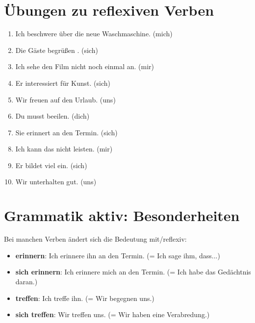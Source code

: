 \section{Übungen zu reflexiven Verben}
\label{sec:ReflexivUebungenAlt}

\begin{enumerate}
    \item Ich beschwere \underline{\hspace{1cm}} über die neue Waschmaschine. (mich)
    \item Die Gäste begrüßen \underline{\hspace{1cm}}. (sich)
    \item Ich sehe \underline{\hspace{1cm}} den Film nicht noch einmal an. (mir)
    \item Er interessiert \underline{\hspace{1cm}} für Kunst. (sich)
    \item Wir freuen \underline{\hspace{1cm}} auf den Urlaub. (uns)
    \item Du musst \underline{\hspace{1cm}} beeilen. (dich)
    \item Sie erinnert \underline{\hspace{1cm}} an den Termin. (sich)
    \item Ich kann \underline{\hspace{1cm}} das nicht leisten. (mir)
    \item Er bildet \underline{\hspace{1cm}} viel ein. (sich)
    \item Wir unterhalten \underline{\hspace{1cm}} gut. (uns)
\end{enumerate}

\section{Grammatik aktiv: Besonderheiten}
\label{sec:ReflexivBesonderheiten}

\begin{tcolorbox}[title=Wichtig]
Bei manchen Verben ändert sich die Bedeutung mit/reflexiv:
\end{tcolorbox}

\begin{itemize}
    \item \textbf{erinnern}: Ich erinnere ihn an den Termin. (= Ich sage ihm, dass...)
    \item \textbf{sich erinnern}: Ich erinnere mich an den Termin. (= Ich habe das Gedächtnis daran.)
    \item \textbf{treffen}: Ich treffe ihn. (= Wir begegnen uns.)
    \item \textbf{sich treffen}: Wir treffen uns. (= Wir haben eine Verabredung.)
\end{itemize}

\chapterend